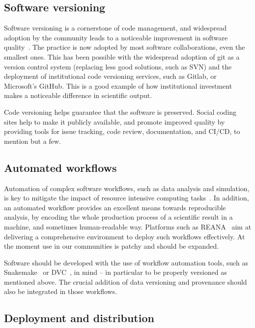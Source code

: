 \subsection{Software versioning}

Software versioning is a cornerstone of code management, and widespread adoption by the community leads to a noticeable improvement in software quality~\cite{swebok4}. The practice is now adopted by most software collaborations, even the smallest ones. This has been possible with the widespread adoption of git as a version control system (replacing less good solutions, such as SVN) and the deployment of institutional code versioning services, such as Gitlab, or Microsoft's GitHub. This is a good example of how institutional investment makes a noticeable difference in scientific output.

Code versioning helps guarantee that the software is preserved. Social coding sites help to make it publicly available, and promote improved quality by providing tools for issue tracking, code review, documentation, and CI/CD, to mention but a few. 


\subsection{Automated workflows}

Automation of complex software workflows, such as data analysis and simulation, is key to mitigate the impact of resource intensive computing tasks~\cite{swebok4}. In addition, an automated workflow provides an excellent means towards reproducible analysis, by encoding the whole production process of a scientific result in a machine, and sometimes human-readable way. Platforms such as REANA~\cite{REANA} aim at delivering a comprehensive environment to deploy such workflows effectively. At the moment use in our communities is patchy and should be expanded.

Software should be developed with the use of workflow automation tools, such as Snakemake~\cite{snakemake} or DVC~\cite{The_DVC_team_and_contributors_DVC_Data_Version}, in mind -- in particular to be properly versioned as mentioned above. The crucial addition of data versioning and provenance should also be integrated in those workflows. 

\subsection{Deployment and distribution}

